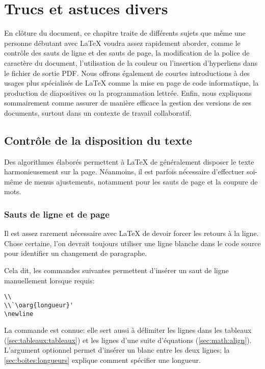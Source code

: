 \chapter{Trucs et astuces divers}
\label{chap:trucs}

En clôture du document, ce chapitre traite de différents sujets que
même une personne débutant avec {\LaTeX} voudra assez rapidement
aborder, comme le contrôle des sauts de ligne et des sauts de page, la
modification de la police de caractère du document, l'utilisation de
la couleur ou l'insertion d'hyperliens dans le fichier de sortie PDF.
Nous offrons également de courtes introductions à des usages plus
spécialisés de {\LaTeX} comme la mise en page de code informatique, la
production de diapositives ou la programmation lettrée. Enfin, nous
expliquons sommairement comme assurer de manière efficace la gestion
des versions de ses documents, surtout dans un contexte de travail
collaboratif.

\section{Contrôle de la disposition du texte}
\label{sec:trucs:controle}

Des algorithmes élaborés permettent à {\LaTeX} de généralement
disposer le texte harmonieusement sur la page. Néanmoins, il
est parfois nécessaire  d'effectuer soi-même de menus ajustements,
notamment pour les sauts de page et la coupure de mots.

\subsection{Sauts de ligne et de page}
\label{sec:trucs:controle:sauts}

Il est assez rarement nécessaire avec {\LaTeX} de devoir forcer les
retours à la ligne. Chose certaine, l'on devrait toujours utiliser une
ligne blanche dans le code source pour identifier un changement de
paragraphe.

Cela dit, les commandes suivantes permettent d'insérer un saut de
ligne manuellement lorsque requis:
\begin{lstlisting}
\\
\\`\oarg{longueur}'
\newline
\end{lstlisting}
La commande {\pixbsbs} est connue: elle sert aussi à délimiter les
lignes dans les tableaux (\autoref{sec:tableaux:tableaux}) et les lignes
d'une suite d'équations (\autoref{sec:math:align}). L'argument optionnel
 permet d'insérer un blanc entre les deux lignes; la
\autoref{sec:boites:longueurs} explique comment spécifier une
longueur.


